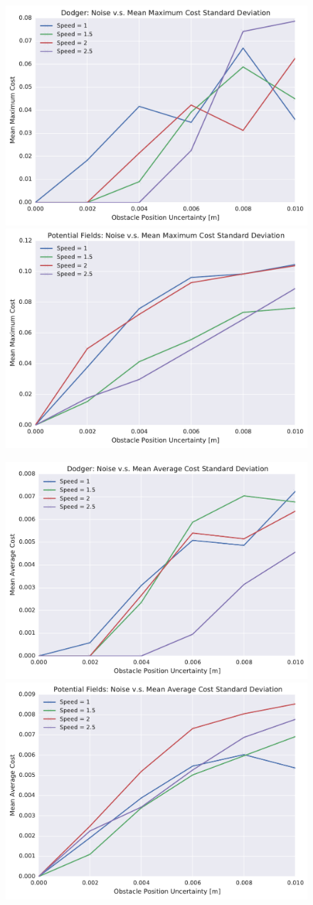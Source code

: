 \begin{figure}[h!]
    \centering
    \includegraphics[width=0.48\linewidth]{figs/planner_std_max_cost_0}
    \includegraphics[width=0.48\linewidth]{figs/pf_std_max_cost_0}
    \caption{}
    \label{fig:plot_std_max_cost}
\end{figure}

\begin{figure}[h!]
    \centering
    \includegraphics[width=0.48\linewidth]{figs/planner_std_avg_cost_0}
    \includegraphics[width=0.48\linewidth]{figs/pf_std_avg_cost_0}
    \caption{}
    \label{fig:plot_std_avg_cost}
\end{figure}

